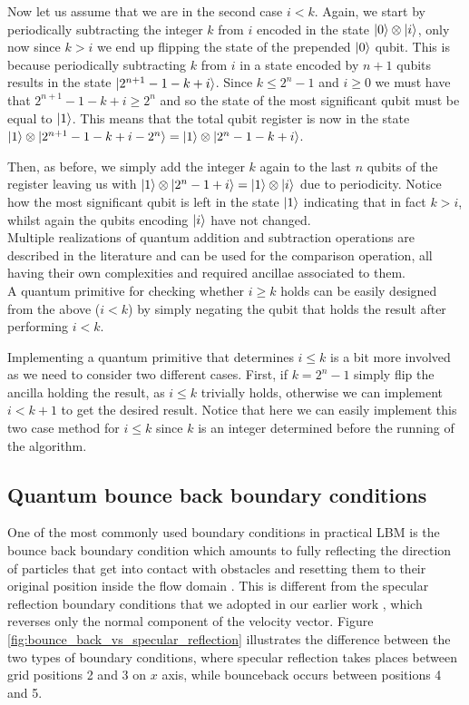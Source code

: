 Now let us assume that we are in the second case $i<k$. Again, we start by periodically subtracting the integer $k$ from $i$ encoded in the state $\ket{0}\otimes\ket{i}$, only now since $k>i$ we end up flipping the state of the prepended $\ket{0}$ qubit. This is because periodically subtracting $k$ from $i$ in a state encoded by $n+1$ qubits results in the state $\ket{2^{n+1} -1 - k +i}$. Since $k \leq 2^n-1$ and $i \geq 0$ we must have that $2^{n+1} -1 - k +i \geq 2^n$ and so the state of the most significant qubit must be equal to $\ket{1}$. This means that the total qubit register is now in the state $\ket{1} \otimes \ket{2^{n+1} -1 - k +i - 2^n} =\ket{1} \otimes \ket{2^{n} -1 - k +i }  $. 

Then, as before, we simply add the integer $k$ again to the last $n$ qubits of the register leaving us with $\ket{1} \otimes \ket{2^{n} -1 +i } = \ket{1} \otimes \ket{ i } $ due to periodicity. Notice how the most significant qubit is left in the state $\ket{1}$ indicating that in fact $k > i$, whilst again the qubits encoding $\ket{i}$ have not changed.  \\

Multiple realizations of quantum addition and subtraction operations are described in the literature \cite{Häner2017,Takahashi2009,Cuccaro2004,Draper1998} and can be used for the comparison operation, all having their own complexities and required ancillae associated to them. \\

A quantum primitive for checking whether $i\geq k$ holds can be easily designed from the above ($i<k$) by simply negating the qubit that holds the result after performing $i<k$. 

Implementing a quantum primitive that determines $i\leq k$ is a bit more involved as we need to consider two different cases. First, if $k = 2^n -1$ simply flip the ancilla holding the result, as $i \leq k$ trivially holds, otherwise we can implement $i< k+1$ to get the desired result. Notice that here we can easily implement this two case method for $i \leq k$ since $k$ is an integer determined before the running of the algorithm. 


\subsection{Quantum bounce back boundary conditions}\label{sec:qbb}
One of the most commonly used boundary conditions in practical LBM is the bounce back boundary condition which amounts to fully reflecting the direction of particles that get into contact with obstacles and resetting them to their original position inside the flow domain \cite{Schiller2008, Kruger2017}. This is different from the specular reflection boundary conditions that we adopted in our earlier work \cite{Schalkers2022}, which reverses only the normal component of the velocity vector. Figure \ref{fig:bounce_back_vs_specular_reflection} illustrates the difference between the two types of boundary conditions, where specular reflection takes places between grid positions 2 and 3 on $x$ axis, while bounceback occurs between positions 4 and 5. 

